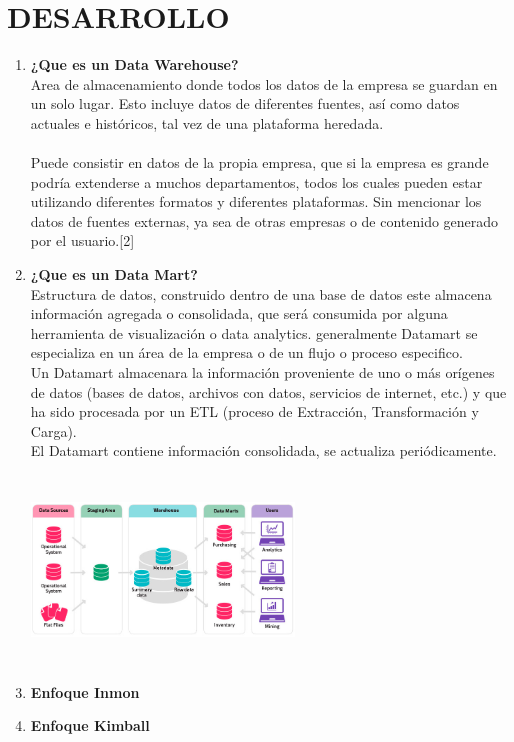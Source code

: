 \documentclass[twoside,twocolumn]{article}
\begin{document}
\section{DESARROLLO}
\begin{enumerate}
 \item \textbf{¿Que es un Data Warehouse?}\\
Area de almacenamiento donde todos los datos de la empresa se guardan en un solo lugar. Esto incluye datos de diferentes fuentes, así como datos actuales e históricos, tal vez de una plataforma heredada.\\ \\
Puede consistir en datos de la propia empresa, que si la empresa es grande podría extenderse a muchos departamentos, todos los cuales pueden estar utilizando diferentes formatos y diferentes plataformas. Sin mencionar los datos de fuentes externas, ya sea de otras empresas o de contenido generado por el usuario.[2]

 \item \textbf{¿Que es un Data Mart?} \\
Estructura de datos, construido dentro de una base de datos este almacena información agregada o consolidada, que será consumida por alguna herramienta de visualización o data analytics. generalmente Datamart se especializa en un área de la empresa o de un flujo o proceso especifico. \\

Un Datamart almacenara la información proveniente de uno o más orígenes de datos (bases de datos, archivos con datos, servicios de internet, etc.) y que ha sido procesada por un ETL (proceso de Extracción, Transformación y Carga).\\

El Datamart contiene información consolidada, se actualiza periódicamente.

\includegraphics[width=7cm, height=5cm]{Imagenes/datawarehouse_datamart}

 \item \textbf{Enfoque Inmon}

 \item \textbf{Enfoque Kimball}
   
\end{enumerate}
\end{document}

